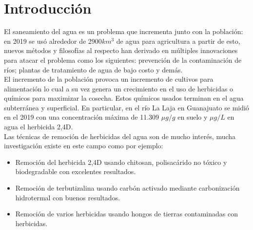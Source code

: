 \chapter{Introducción}

El saneamiento del agua es un problema que incrementa junto con la población: en 2019 se usó alrededor de 2900$km^3$ de agua para agricultura \cite{un2020} a partir de esto, nuevos métodos y filosofías al respecto han derivado en múltiples innovaciones para atacar el problema como los siguientes: prevención de la contaminación de ríos; plantas de tratamiento de agua de bajo costo y demás.\\ 

El incremento de la población provoca un incremento de cultivos para alimentación lo cual a su vez genera un crecimiento en el uso de herbicidas o químicos para maximizar la cosecha. Estos químicos usados terminan en el agua subterránea y superficial. En particular, en el río La Laja en Guanajuato se midió en el 2019 con una concentración máxima de 11.309 $\mu g / g$ en suelo y $\mu g / L$ en agua el herbicida 2,4D\cite{ineec2019}.\\

Las técnicas de remoción de herbicidas del agua son de mucho interés, mucha investigación existe en este campo como por ejemplo:

\begin{itemize}
    \item Remoción del herbicida 2,4D usando chitosan, polisacárido no tóxico y biodegradable con excelentes resultados\cite{Nunes2019}.
    \item Remoción de terbutizalina usando carbón activado mediante carbonización hidrotermal con buenos resultados\cite{tasca2019}.
    \item Remoción de varios herbicidas usando hongos de tierras contaminadas con herbicidas\cite{Bordjiba2001}.
\end{itemize}

